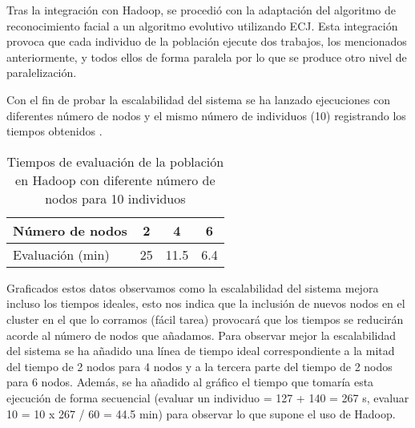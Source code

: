 
Tras la integraci\'on con Hadoop, se procedi\'o con la adaptaci\'on del algoritmo de reconocimiento facial a un algoritmo evolutivo utilizando ECJ. Esta integraci\'on provoca que cada individuo de la poblaci\'on ejecute dos trabajos, los mencionados anteriormente, y todos ellos de forma paralela por lo que se produce otro nivel de paralelizaci\'on. 

Con el fin de probar la escalabilidad del sistema se ha lanzado ejecuciones con diferentes n\'umero de nodos y el mismo n\'umero de individuos (10) registrando los tiempos obtenidos .

\begin{table}[H]
  \begin{center}
    \begin{center}
    \begin{tabular}{l | c c c}
    N\'umero de nodos & 2 & 4 & 6 \\ \hline
    Evaluaci\'on (min) & 25 & 11.5 & 6.4\\
    \end{tabular}
    \end{center}
    \caption{Tiempos de evaluaci\'on de la poblaci\'on en Hadoop con diferente n\'umero de nodos para 10 individuos}
    \label{tabla-dif-num-nodos}
  \end{center}
\end{table}


Graficados estos datos  observamos como la escalabilidad del sistema mejora incluso los tiempos ideales, esto nos indica que la inclusi\'on de nuevos nodos en el cluster en el que lo corramos (f\'acil tarea) provocar\'a que los tiempos se reducir\'an acorde al n\'umero de nodos que a\~nadamos. Para observar mejor la escalabilidad del sistema se ha a\~nadido una l\'inea de tiempo ideal correspondiente a la mitad del tiempo de 2 nodos para 4 nodos y a la tercera parte del tiempo de 2 nodos para 6 nodos. Adem\'as, se ha a\~nadido al gr\'afico el tiempo que tomar\'ia esta ejecuci\'on de forma secuencial (evaluar un individuo {= 127 + 140 = 267 s}, evaluar 10 {= 10 x 267 / 60 = 44.5 min}) para observar lo que supone el uso de Hadoop.

